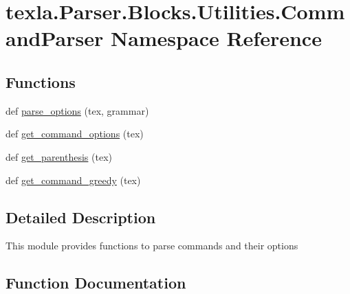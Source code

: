 \hypertarget{namespacetexla_1_1Parser_1_1Blocks_1_1Utilities_1_1CommandParser}{}\section{texla.\+Parser.\+Blocks.\+Utilities.\+Command\+Parser Namespace Reference}
\label{namespacetexla_1_1Parser_1_1Blocks_1_1Utilities_1_1CommandParser}
\subsection*{Functions}
\begin{DoxyCompactItemize}
\item 
def \hyperlink{namespacetexla_1_1Parser_1_1Blocks_1_1Utilities_1_1CommandParser_ae5151087472a2e6b0d28da5f9224e9e4}{parse\+\_\+options} (tex, grammar)
\item 
def \hyperlink{namespacetexla_1_1Parser_1_1Blocks_1_1Utilities_1_1CommandParser_a9ed772dd4465a09de477be8a41d7e488}{get\+\_\+command\+\_\+options} (tex)
\item 
def \hyperlink{namespacetexla_1_1Parser_1_1Blocks_1_1Utilities_1_1CommandParser_a1120aff35098766efef7b74afce53203}{get\+\_\+parenthesis} (tex)
\item 
def \hyperlink{namespacetexla_1_1Parser_1_1Blocks_1_1Utilities_1_1CommandParser_ac8f7988993d99b285f696924eb13c207}{get\+\_\+command\+\_\+greedy} (tex)
\end{DoxyCompactItemize}


\subsection{Detailed Description}
\begin{DoxyVerb}This module provides functions to parse commands and
their options
\end{DoxyVerb}
 

\subsection{Function Documentation}
\hypertarget{namespacetexla_1_1Parser_1_1Blocks_1_1Utilities_1_1CommandParser_ac8f7988993d99b285f696924eb13c207}{}\label{namespacetexla_1_1Parser_1_1Blocks_1_1Utilities_1_1CommandParser_ac8f7988993d99b285f696924eb13c207} 
